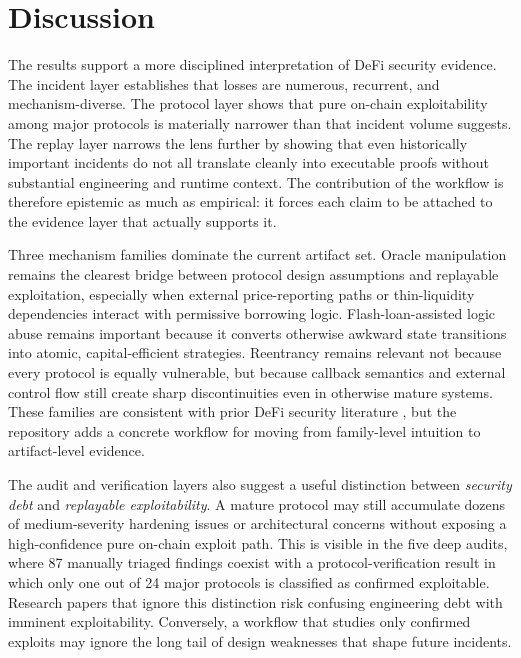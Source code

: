 \section{Discussion}
\label{sec:discussion}

The results support a more disciplined interpretation of DeFi security evidence. The incident layer establishes that losses are numerous, recurrent, and mechanism-diverse. The protocol layer shows that pure on-chain exploitability among major protocols is materially narrower than that incident volume suggests. The replay layer narrows the lens further by showing that even historically important incidents do not all translate cleanly into executable proofs without substantial engineering and runtime context. The contribution of the workflow is therefore epistemic as much as empirical: it forces each claim to be attached to the evidence layer that actually supports it.

Three mechanism families dominate the current artifact set. Oracle manipulation remains the clearest bridge between protocol design assumptions and replayable exploitation, especially when external price-reporting paths or thin-liquidity dependencies interact with permissive borrowing logic. Flash-loan-assisted logic abuse remains important because it converts otherwise awkward state transitions into atomic, capital-efficient strategies. Reentrancy remains relevant not because every protocol is equally vulnerable, but because callback semantics and external control flow still create sharp discontinuities even in otherwise mature systems. These families are consistent with prior DeFi security literature \citep{qin2021attacking,zhou2023sok}, but the repository adds a concrete workflow for moving from family-level intuition to artifact-level evidence.

The audit and verification layers also suggest a useful distinction between \emph{security debt} and \emph{replayable exploitability}. A mature protocol may still accumulate dozens of medium-severity hardening issues or architectural concerns without exposing a high-confidence pure on-chain exploit path. This is visible in the five deep audits, where 87 manually triaged findings coexist with a protocol-verification result in which only one out of 24 major protocols is classified as confirmed exploitable. Research papers that ignore this distinction risk confusing engineering debt with imminent exploitability. Conversely, a workflow that studies only confirmed exploits may ignore the long tail of design weaknesses that shape future incidents.

